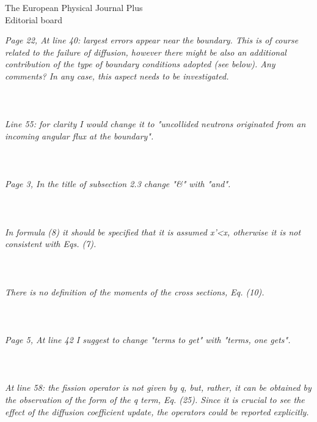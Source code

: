\documentclass[11pt]{letter} %
\newcommand{\revised}[1]{{\color{red}{#1}}}
\begin{document}
\begin{letter}{The European Physical Journal Plus \\
Editorial board}
\newpage

\textit{Page 22, At line 40: largest errors appear near the boundary. This is of course related to the failure of diffusion, however there might be also an additional contribution of the type of boundary conditions adopted (see below). Any comments? In any case, this aspect needs to be investigated.}
\\ \\
\revised{T}
\\ \\
\textit{Line 55: for clarity I would change it to "uncollided neutrons originated from an incoming angular flux at the boundary".}
\\ \\
\revised{T}
\\ \\
\textit{Page 3, In the title of subsection 2.3 change "\&" with "and".}
\\ \\
\revised{T}
\\ \\
\textit{In formula (8) it should be specified that it is assumed x'<x, otherwise it is not consistent with Eqs. (7).}
\\ \\
\revised{T}
\\ \\
\textit{There is no definition of the moments of the cross sections, Eq. (10).}
\\ \\
\revised{T}
\\ \\
\textit{Page 5, At line 42 I suggest to change "terms to get" with "terms, one gets".}
\\ \\
\revised{T}
\\ \\
\textit{At line 58: the fission operator is not given by q, but, rather, it can be obtained by the observation of the form of the q term, Eq. (25). Since it is crucial to see the effect of the diffusion coefficient update, the operators could be reported explicitly.}
\\ \\
\revised{T}
\\ \\


\end{letter}
\end{document}
